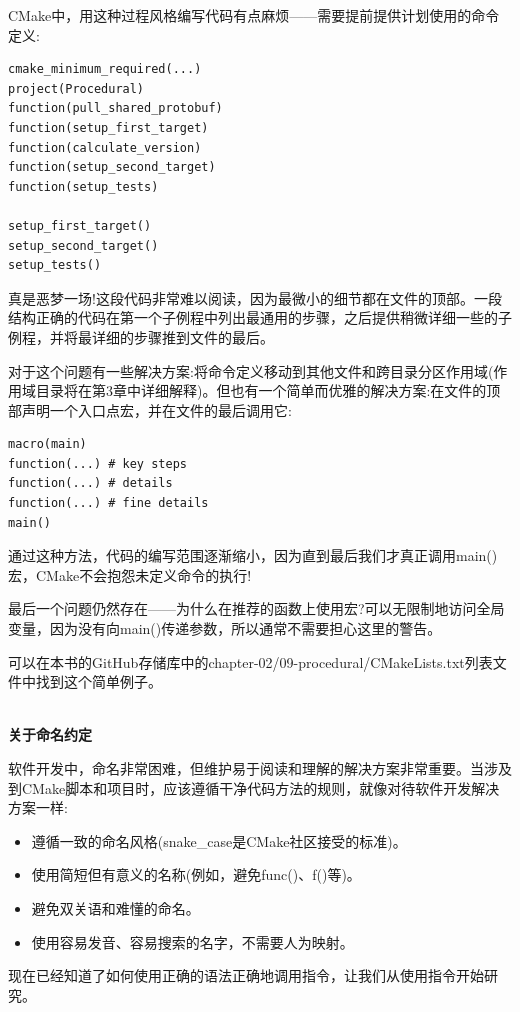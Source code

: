 CMake中，用这种过程风格编写代码有点麻烦——需要提前提供计划使用的命令定义:

\begin{lstlisting}[style=styleCMake]
cmake_minimum_required(...)
project(Procedural)
function(pull_shared_protobuf)
function(setup_first_target)
function(calculate_version)
function(setup_second_target)
function(setup_tests)

setup_first_target()
setup_second_target()
setup_tests()
\end{lstlisting}

真是恶梦一场!这段代码非常难以阅读，因为最微小的细节都在文件的顶部。一段结构正确的代码在第一个子例程中列出最通用的步骤，之后提供稍微详细一些的子例程，并将最详细的步骤推到文件的最后。

对于这个问题有一些解决方案:将命令定义移动到其他文件和跨目录分区作用域(作用域目录将在第3章中详细解释)。但也有一个简单而优雅的解决方案:在文件的顶部声明一个入口点宏，并在文件的最后调用它:

\begin{lstlisting}[style=styleCMake]
macro(main)
function(...) # key steps
function(...) # details
function(...) # fine details
main()
\end{lstlisting}

通过这种方法，代码的编写范围逐渐缩小，因为直到最后我们才真正调用main()宏，CMake不会抱怨未定义命令的执行!

最后一个问题仍然存在——为什么在推荐的函数上使用宏?可以无限制地访问全局变量，因为没有向main()传递参数，所以通常不需要担心这里的警告。

可以在本书的GitHub存储库中的chapter-02/09-procedural/CMakeLists.txt列表文件中找到这个简单例子。

\hspace*{\fill} \\ %
\noindent
\textbf{关于命名约定}

软件开发中，命名非常困难，但维护易于阅读和理解的解决方案非常重要。当涉及到CMake脚本和项目时，应该遵循干净代码方法的规则，就像对待软件开发解决方案一样:

\begin{itemize}
\item 
遵循一致的命名风格(snake\_case是CMake社区接受的标准)。

\item 
使用简短但有意义的名称(例如，避免func()、f()等)。

\item 
避免双关语和难懂的命名。

\item 
使用容易发音、容易搜索的名字，不需要人为映射。
\end{itemize}

现在已经知道了如何使用正确的语法正确地调用指令，让我们从使用指令开始研究。
















